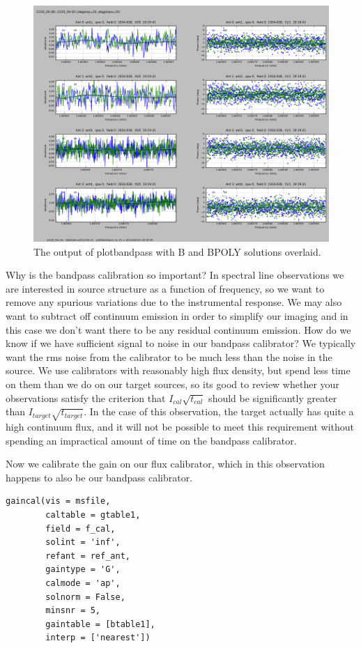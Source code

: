 \documentclass[force,almostfull,justified]{tufte-book}
\begin{document}
\begin{figure}
  \includegraphics[width=\textwidth]{images/plotbandpass_bpoly}
  \caption[]{The output of plotbandpass with B and BPOLY solutions overlaid.}
  \forceversofloat
  \label{fig:plotbandpass_bpoly}
\end{figure}

Why is the bandpass calibration so important?  In spectral line observations we are interested in
source structure as a function of frequency, so we want to remove any spurious variations due to the
instrumental response. We may also want to subtract off continuum emission in order to simplify our
imaging and in this case we don't want there to be any residual continuum emission. How do we know if
we have sufficient signal to noise in our bandpass calibrator?  We typically want the rms noise from
the calibrator to be much less than the noise in the source.  We use calibrators with reasonably high
flux density, but spend less time on them than we do on our target sources, so its good to review
whether your observations satisfy the criterion that $I_{cal} \sqrt{t_{cal}}$ should be significantly
greater than $I_{target}\sqrt{t_{target}}$. In the case of this observation, the target actually has
quite a high continuum flux, and it will not be possible to meet this requirement without spending an
impractical amount of time on the bandpass calibrator.

Now we calibrate the gain on our flux calibrator, which in this observation happens to also be our
bandpass calibrator.

\begin{casacmd}
\begin{verbatim}
gaincal(vis = msfile,
        caltable = gtable1,
        field = f_cal,
        solint = 'inf',
        refant = ref_ant,
        gaintype = 'G',
        calmode = 'ap',
        solnorm = False,
        minsnr = 5,
        gaintable = [btable1],
        interp = ['nearest'])
\end{verbatim}
\end{casacmd}
\end{document}
